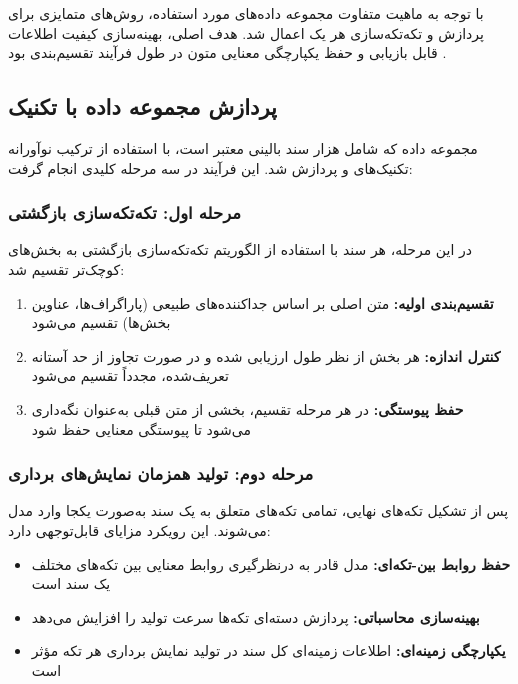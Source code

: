 \documentclass[11pt, a4paper, oneside]{book}
\begin{document}
	با توجه به ماهیت متفاوت مجموعه داده‌های مورد استفاده، روش‌های متمایزی برای پردازش و تکه‌تکه‌سازی هر یک اعمال شد. هدف اصلی، بهینه‌سازی کیفیت اطلاعات قابل بازیابی و حفظ یکپارچگی معنایی متون در طول فرآیند تقسیم‌بندی بود \cite{guo_lightrag_2024}.

	\subsection{پردازش مجموعه داده  با تکنیک }

	مجموعه داده  که شامل  هزار سند بالینی معتبر است، با استفاده از ترکیب نوآورانه تکنیک‌های  و  پردازش شد. این فرآیند در سه مرحله کلیدی انجام گرفت:

	\subsubsection{مرحله اول: تکه‌تکه‌سازی بازگشتی}

	در این مرحله، هر سند با استفاده از الگوریتم تکه‌تکه‌سازی بازگشتی به بخش‌های کوچک‌تر تقسیم شد:

	\begin{enumerate}
		\item \textbf{تقسیم‌بندی اولیه:} متن اصلی بر اساس جداکننده‌های طبیعی (پاراگراف‌ها، عناوین بخش‌ها) تقسیم می‌شود
		\item \textbf{کنترل اندازه:} هر بخش از نظر طول ارزیابی شده و در صورت تجاوز از حد آستانه تعریف‌شده، مجدداً تقسیم می‌شود
		\item \textbf{حفظ پیوستگی:} در هر مرحله تقسیم، بخشی از متن قبلی به‌عنوان  نگه‌داری می‌شود تا پیوستگی معنایی حفظ شود
	\end{enumerate}

	\subsubsection{مرحله دوم: تولید همزمان نمایش‌های برداری}

	پس از تشکیل تکه‌های نهایی، تمامی تکه‌های متعلق به یک سند به‌صورت یکجا وارد مدل  می‌شوند. این رویکرد مزایای قابل‌توجهی دارد:

	\begin{itemize}
		\item \textbf{حفظ روابط بین-تکه‌ای:} مدل  قادر به درنظرگیری روابط معنایی بین تکه‌های مختلف یک سند است
		\item \textbf{بهینه‌سازی محاسباتی:} پردازش دسته‌ای تکه‌ها سرعت تولید  را افزایش می‌دهد
		\item \textbf{یکپارچگی زمینه‌ای:} اطلاعات زمینه‌ای کل سند در تولید نمایش برداری هر تکه مؤثر است
	\end{itemize}
\end{document}
